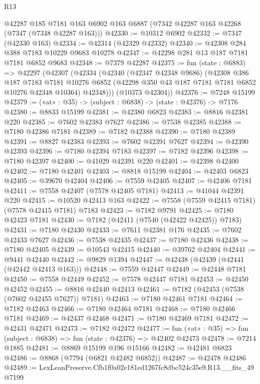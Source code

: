 \begin{lexlean}{R13}
\begin{coremodule}
    @42287
    @185
    @7181
    @163
    @6902
    @163
    @6887
    (@7342 @42287 @163 @42268 (@7347 (@7348 @42287 @163)))
@42330 := @10312 @6902
@42332 := @7347 (@42330 @163)
@42334 := @42314 (@42329 @42332)
@42340 := @42308 @284 @388 @7183 @10229 @9683 @10278
@42347 := @42298 @281 @13 @187 @7181 @7181 @6852 @9683
@42348 := @7379 @42287
@42375 := fun (state : @6883) =>
  @42297
    (@42307
      (@42334
        (@42340
          (@42347 @42348 @9686)
          (@42308
            @386
            @187
            @7183
            @7181
            @10276
            @6852
            (@42298 @350 @43 @187 @7181 @7181 @6852 @10276 @42348 @10364)
            @42348)))
      (@10373 @42304))
@42376 := @7248 @15199
@42379 := («at» : @35) -> (subject : @6838) -> (state : @42376) -> @7176
@42380 := @8833 @15199
@42381 := @42380 @6823
@42383 := @8816 @42381 @220
@42385 := @7602 @42383 @7627
@42386 := @7538 @42385
@42388 := @7180 @42386 @7181
@42389 := @7182 @42388
@42390 := @7180 @42389
@42391 := @8827 @42383
@42393 := @7602 @42391 @7627
@42394 := @42390 @42393
@42396 := @7180 @42394 @7183
@42397 := @7182 @42396
@42398 := @7180 @42397
@42400 := @41029 @42391 @220
@42401 := @42398 @42400
@42402 := @7180 @42401
@42403 := @8818 @15199
@42404 := @42403 @6823
@42405 := @39670 @42404
@42406 := @7559 @42405
@42407 := @42406 @7181
@42411 := @7558 @42407 (@7578 @42405 @7181)
@42413 := @41044 @42391 @220
@42415 := @10520 @42413 @163
@42422 := @7558 (@7559 @42415 @7181) (@7578 @42415 @7181) @7183
@42423 := @7182 @9791
@42425 := @7180 @42423 @7181
@42430 := @7182 (@42411 (@7540 (@42422 @42425)) @7183)
@42431 := @7180 @42430
@42433 := @7611 @42381 @176
@42435 := @7602 @42433 @7627
@42436 := @7538 @42435
@42437 := @7180 @42436
@42438 := @7180 @42405
@42439 := @10543 @42415
@42440 := @39762 @42404
@42441 := @9441 @42440
@42442 := @9829 @1394
@42447 := @42438 (@42439 (@42441 (@42442 @42413 @163)))
@42448 := @7559 @42447
@42449 := @42448 @7181
@42450 := @7558 @42449
@42452 := @7578 @42447 @7181
@42453 := @42450 @42452
@42455 := @8816 @42440 @42413
@42461 := @7182 (@42453 (@7538 (@7602 @42455 @7627)) @7181)
@42463 := @7180 @42461 @7181
@42464 := @7182 @42463
@42466 := @7180 @42464 @7181
@42468 := @7180 @42466 @7181
@42469 := @42437 @42468
@42471 := @7180 @42469 @7181
@42472 := @42431 @42471
@42473 := @7182 @42472
@42477 := fun («at» : @35) => fun (subject : @6838) => fun (state : @42376) => @42402 @42473
@42478 := @7214 @1885
@42481 := @8869 @15199 @196 @15166
@42482 := @42481 @6823
@42486 := @8868 (@7794 (@6821 @42482 @6852))
@42487 := @42478 @42486
@42489 := LexLeanPreserve.Cfb1f0a02e181ed1267fc8dbc524c35e9.R13.__fits_49 @7199

\end{coremodule}
\end{lexlean}
